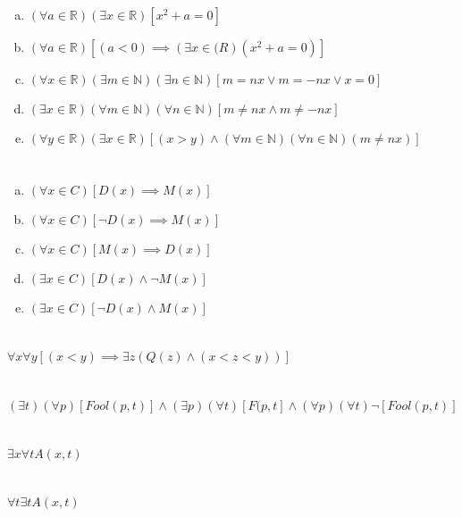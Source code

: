 \documentclass{article}
\begin{document}
\begin{enumerate}[(a)]
\item $(\forall a \in \mathbb{R})(\exists x \in \mathbb{R})[x^2 + a = 0]$
\item $(\forall a \in \mathbb{R})[(a < 0) \implies (\exists x \in \mathbb(R)(x^2 + a = 0)]$
\item $(\forall x \in \mathbb{R})(\exists m \in \mathbb{N})(\exists n \in \mathbb{N})[m = nx \vee m = -nx \vee x = 0]$
\item $(\exists x \in \mathbb{R})(\forall m \in \mathbb{N})(\forall n \in \mathbb{N})[m \neq nx \wedge m \neq -nx]$
\item $(\forall y \in \mathbb{R})(\exists x \in \mathbb{R})[(x > y) \wedge (\forall m \in \mathbb{N})(\forall n \in \mathbb{N})(m \neq nx)]$
\end{enumerate}

\section{}

\begin{enumerate}[(a)]
\item $(\forall x \in C)[D(x) \implies M(x)]$
\item $(\forall x \in C)[\neg D(x) \implies M(x)]$
\item $(\forall x \in C)[M(x) \implies D(x)]$
\item $(\exists x \in C)[D(x) \wedge \neg M(x)]$
\item $(\exists x \in C)[\neg D(x) \wedge M(x)]$
\end{enumerate}

\section{}

$\forall x \forall y[(x < y) \implies \exists z(Q(z) \wedge (x < z < y))]$

\section{}

$(\exists t)(\forall p)[Fool(p, t)] \wedge (\exists p)(\forall t)[F(p, t] \wedge (\forall p)(\forall t)\neg[Fool(p, t)]$

\section{}

$\exists x \forall t A(x, t)$


\section{}

$\forall t \exists t A(x, t)$
\end{document}
